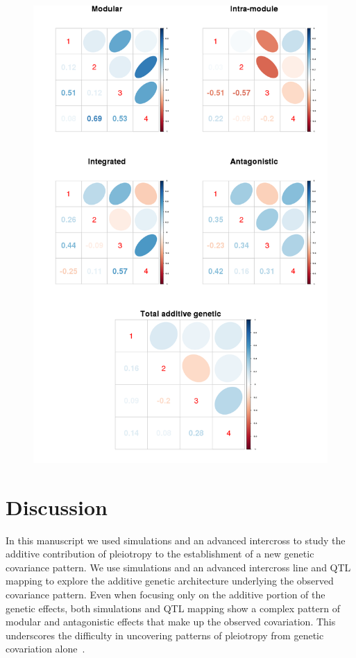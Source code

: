 \begin{refsection}
\begin{figure}
    \centering
    \includegraphics[width=\linewidth]{chapter_atchley/media/additive_matrices_by_class.png}
    \caption[Covariance matrices by effect class]{}
    \label{additive_effects_matrices}
\end{figure}


\section{Discussion}

In this manuscript we used simulations and an advanced intercross to study the
additive contribution of pleiotropy to the establishment of a new genetic
covariance pattern. We use simulations and an advanced intercross line and QTL
mapping to explore the additive genetic architecture underlying the observed
covariance pattern. Even when focusing only on the additive portion of the
genetic effects, both simulations and QTL mapping show a complex pattern of
modular and antagonistic effects that make up the observed covariation. This
underscores the difficulty in uncovering patterns of pleiotropy from genetic
covariation alone~\parencite{Mitteroecker2007-xq, Mitteroecker2009-jb}.


\end{refsection}
